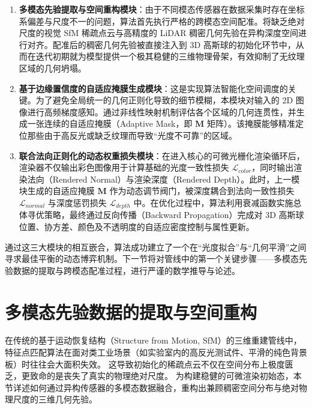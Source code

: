 \begin{enumerate}
    \item \textbf{多模态先验提取与空间重构模块}：由于不同模态传感器在数据采集时存在坐标系偏差与尺度不一的问题，算法首先执行严格的跨模态空间配准。将缺乏绝对尺度的视觉 SfM 稀疏点云与高精度的 LiDAR 稠密几何先验在异构深度空间进行对齐。配准后的稠密几何先验被直接注入到 3D 高斯球的初始化环节中，从而在迭代初期就为模型提供一个极其稳健的三维物理骨架，有效抑制了无纹理区域的几何坍塌。
    
    \item \textbf{基于边缘置信度的自适应掩膜生成模块}：这是实现算法智能化空间调度的关键。为了避免全局统一的几何正则化导致的细节模糊，本模块对输入的 2D 图像进行高频梯度感知。通过非线性映射机制评估各个区域的几何连贯性，并生成一张连续的自适应掩膜（Adaptive Mask，即 $\bm{M}$ 矩阵）。该掩膜能够精准定位那些由于高反光或缺乏纹理而导致“光度不可靠”的区域。
    
    \item \textbf{联合法向正则化的动态权重损失模块}：在进入核心的可微光栅化渲染循环后，渲染器不仅输出彩色图像用于计算基础的光度一致性损失 $\mathcal{L}_{color}$，同时输出渲染法向（Rendered Normal）与渲染深度（Rendered Depth）。此时，上一模块生成的自适应掩膜 $\bm{M}$ 作为动态调节阀门，被深度耦合到法向一致性损失 $\mathcal{L}_{normal}$ 与深度惩罚损失 $\mathcal{L}_{depth}$ 中。在优化过程中，算法利用衰减函数实施总体寻优策略，最终通过反向传播（Backward Propagation）完成对 3D 高斯球位置、协方差、颜色及不透明度的自适应密度控制与属性更新。
\end{enumerate}

通过这三大模块的相互嵌合，算法成功建立了一个在“光度拟合”与“几何平滑”之间寻求最佳平衡的动态博弈机制。下一节将对管线中的第一个关键步骤——多模态先验数据的提取与跨模态配准过程，进行严谨的数学推导与论述。




\section{多模态先验数据的提取与空间重构}
\label{sec:chap3_multimodal_prior}

在传统的基于运动恢复结构（Structure from Motion, SfM）的三维重建管线中，特征点匹配算法在面对类工业场景（如实验室内的高反光测试件、平滑的纯色背景板）时往往会大面积失效。 
这导致初始化的稀疏点云不仅在空间分布上极度匮乏，更致命的是丧失了真实的物理绝对尺度。
为构建稳健的可微渲染初始态，本节详述如何通过异构传感器的多模态数据融合，重构出兼顾稠密空间分布与绝对物理尺度的三维几何先验。

